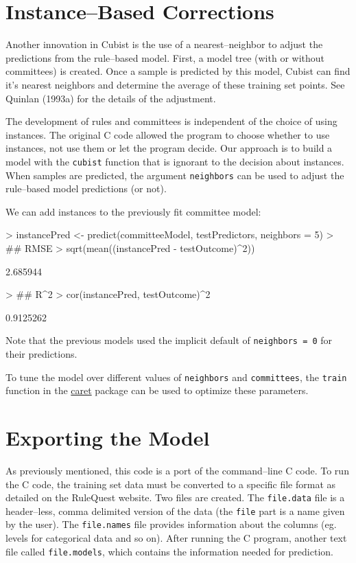 \documentclass[12pt]{article}
\newcommand{\code}[1]{\mbox{\footnotesize\color{darkblue}\texttt{#1}}}
\newcommand{\pkg}[1]{{\fontseries{b}\selectfont #1}}
\renewcommand{\pkg}[1]{{\textsf{#1}}}
\renewenvironment{Schunk}{\vspace{\topsep}}{\vspace{\topsep}}
\begin{document}
\section{Instance--Based Corrections}

Another innovation in Cubist is the use of a nearest--neighbor to adjust the predictions from the rule--based model. First, a model tree (with or without committees) is created. Once a sample is predicted by this model, Cubist can find it's nearest neighbors and determine the average of these training set points. See Quinlan (1993a) for the details of the adjustment.

The development of rules and committees is independent of the choice of using instances. The original \pkg{C} code allowed the program to choose whether to use instances, not use them or let the program decide. Our approach is to build a model with the \code{cubist} function that is ignorant to the decision about instances. When samples are predicted, the argument \code{neighbors} can be used to adjust the rule--based model predictions (or not). 

We can add instances to the previously fit committee model:
\begin{Schunk}
\begin{Sinput}
> instancePred <- predict(committeeModel, testPredictors, neighbors = 5)
> ## RMSE
> sqrt(mean((instancePred - testOutcome)^2))
\end{Sinput}
\begin{Soutput}
[1] 2.685944
\end{Soutput}
\begin{Sinput}
> ## R^2
> cor(instancePred, testOutcome)^2
\end{Sinput}
\begin{Soutput}
[1] 0.9125262
\end{Soutput}
\end{Schunk}
Note that the previous models used the implicit default of \code{neighbors = 0} for their predictions.

To tune the model over different values of \code{neighbors} and
\code{committees}, the \code{train} function in the
\href{http://cran.r-project.org/web/packages/caret/index.html}{caret}
package can be used to optimize these parameters. 


\section{Exporting the Model}

As previously mentioned, this code is a port of the command--line \pkg{C} code. To run the \pkg{C} code, the training set data must be converted to a specific file format as detailed on the RuleQuest website. Two files are created. The \texttt{file.data} file is a header--less, comma delimited version of the data (the \texttt{file} part is a name given by the user). The \texttt{file.names} file provides information about the columns (eg. levels for categorical data and so on). After running the \pkg{C} program, another text file called \texttt{file.models}, which contains the information needed for prediction. 
\end{document}
